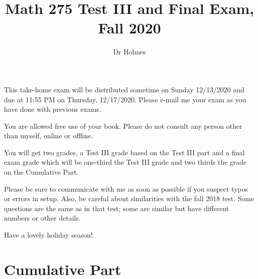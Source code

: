 \documentclass[12pt]{article}
\title{Math 275 Test III and Final Exam, Fall 2020}
\author{Dr Holmes}
\begin{document}
\maketitle

This take-home exam will be distributed sometime on Sunday 12/13/2020 and due at 11:55 PM  on Thursday, 12/17/2020.  Please e-mail me your exam as you have done with previous exams.

You are allowed free use of your book.  Please do not consult any person other than myself, online or offline.

You will get two grades, a Test III grade based on the Test III part and a final exam grade which will be one-third the Test III grade and two thirds the grade on the Cumulative Part.

Please be sure to communicate with me as soon as possible if you suspect typos or errors in setup.  Also, be careful about similarities with the fall 2018 test.  Some questions are the same as in that test;  some are similar but have different numbers or other details.

Have a lovely holiday season!

\newpage

\section{Cumulative Part}
\end{document}
